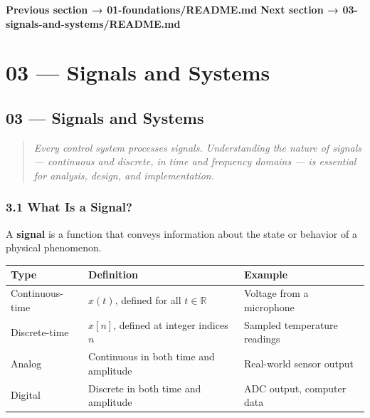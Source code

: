 \documentclass[11pt,a4paper]{book}
\begin{document}
\medskip\noindent\hrulefill\medskip

\textbf{Previous section → 01-foundations/README.md}  
\textbf{Next section → 03-signals-and-systems/README.md}


\chapter{03 — Signals and Systems}
\section{03 — Signals and Systems}

\begin{quote}
\textit{Every control system processes signals. Understanding the nature of signals — continuous and discrete, in time and frequency domains — is essential for analysis, design, and implementation.}
\end{quote}

\medskip\noindent\hrulefill\medskip

\subsection{3.1 What Is a Signal?}

A \textbf{signal} is a function that conveys information about the state or behavior of a physical phenomenon.

\begin{center}
\begin{tabular}{|l|l|l|}
\hline
Type & Definition & Example \\
\hline
Continuous-time & $x(t)$, defined for all $t \in \mathbb{R}$ & Voltage from a microphone \\
Discrete-time & $x[n]$, defined at integer indices $n$ & Sampled temperature readings \\
Analog & Continuous in both time and amplitude & Real-world sensor output \\
Digital & Discrete in both time and amplitude & ADC output, computer data \\
\hline
\end{tabular}
\end{center}

\end{document}
